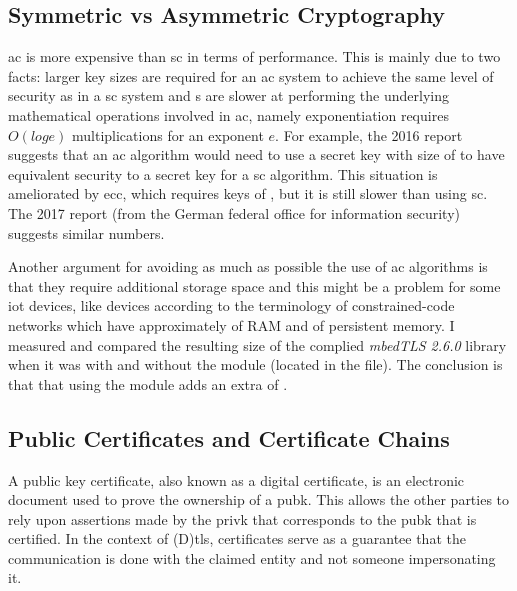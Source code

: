 \documentclass{llncs}
\begin{document}
\subsection{Symmetric vs Asymmetric Cryptography}

\gls{ac} is more expensive than \gls{sc} in terms of performance. This is mainly due
to two facts: larger key sizes are required for an \gls{ac} system to achieve the
same level of security as in a \gls{sc} system  and s are slower at performing the underlying
mathematical operations involved in \gls{ac}, namely exponentiation requires
$O(log e)$ multiplications for an exponent $e$. For example,
the 2016  report \cite{Recommen44:online}
suggests that an \gls{ac} algorithm would need to use a secret key with size of 
to have equivalent security to a  secret key for a \gls{sc} algorithm.
This situation is ameliorated by \gls{ecc}, which requires keys of , but
it is still slower than using \gls{sc}. The 2017  report \cite{Kryptogr1:online} (from the
German federal office for information security) suggests similar numbers.

Another argument for avoiding as much as possible the use of \gls{ac}
algorithms is that they require additional storage space and this might be a problem for some \gls{iot} devices,
like  devices according to the terminology of constrained-code
networks\cite{RFC7228} which have approximately  of RAM and 
of persistent memory. I measured and compared the resulting size of the complied \textit{mbedTLS 2.6.0} library
\cite{SSLLibra13:online} when it was with and without the  module
(located in the  file). The conclusion is that that using the  module adds an extra of .

\subsection{Public Certificates and Certificate Chains}

A public key certificate, also known as a digital certificate, is an electronic
document used to prove the ownership of a \gls{pubk}. This allows the other parties
to rely upon assertions made by the \gls{privk} that corresponds to the \gls{pubk}
that is certified. In the context of (D)\gls{tls}, certificates serve as a guarantee
that the communication is done with the claimed entity and not someone impersonating it.
\end{document}
